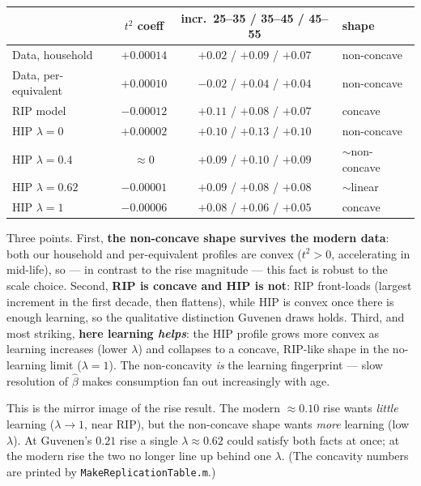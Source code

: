 \documentclass[11pt,fleqn]{article}
\begin{document}
\begin{center}
\begin{tabular}{lccl}
\toprule
 & $t^2$ coeff & incr.\ 25--35 / 35--45 / 45--55 & shape \\
\midrule
Data, household      & $+0.00014$ & $+0.02$ / $+0.09$ / $+0.07$ & non-concave \\
Data, per-equivalent & $+0.00010$ & $-0.02$ / $+0.04$ / $+0.04$ & non-concave \\
RIP model            & $-0.00012$ & $+0.11$ / $+0.08$ / $+0.07$ & concave \\
HIP $\lambda=0$      & $+0.00002$ & $+0.10$ / $+0.13$ / $+0.10$ & non-concave \\
HIP $\lambda=0.4$    & $\approx 0$ & $+0.09$ / $+0.10$ / $+0.09$ & $\sim$non-concave \\
HIP $\lambda=0.62$   & $-0.00001$ & $+0.09$ / $+0.08$ / $+0.08$ & $\sim$linear \\
HIP $\lambda=1$      & $-0.00006$ & $+0.08$ / $+0.06$ / $+0.05$ & concave \\
\bottomrule
\end{tabular}
\end{center}

\noindent Three points. First, \textbf{the non-concave shape survives the modern data}:
both our household and per-equivalent profiles are convex ($t^2>0$, accelerating in
mid-life), so --- in contrast to the rise magnitude --- this fact is robust to the scale
choice. Second, \textbf{RIP is concave and HIP is not}: RIP front-loads (largest increment
in the first decade, then flattens), while HIP is convex once there is enough learning, so
the qualitative distinction Guvenen draws holds. Third, and most striking, \textbf{here
learning \emph{helps}}: the HIP profile grows more convex as learning increases (lower
$\lambda$) and collapses to a concave, RIP-like shape in the no-learning limit
($\lambda=1$). The non-concavity \emph{is} the learning fingerprint --- slow resolution of
$\hat\beta$ makes consumption fan out increasingly with age.

This is the mirror image of the rise result. The modern $\approx0.10$ rise wants
\emph{little} learning ($\lambda\to1$, near RIP), but the non-concave shape wants
\emph{more} learning (low $\lambda$). At Guvenen's $0.21$ rise a single
$\lambda\approx0.62$ could satisfy both facts at once; at the modern rise the two no longer
line up behind one $\lambda$. (The concavity numbers are printed by
\texttt{MakeReplicationTable.m}.)
\end{document}

